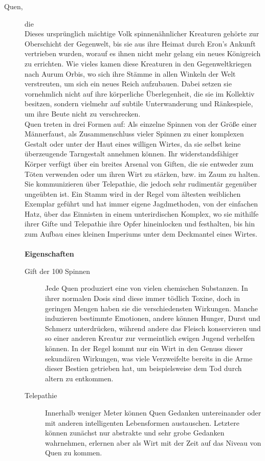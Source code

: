 \documentclass[a4paper,12pt,oneside]{book}
\begin{document}
\begin{description}
\item[Quen,]die
\\Dieses ursprünglich mächtige Volk spinnenähnlicher Kreaturen gehörte zur Oberschicht der Gegenwelt, bis sie aus ihre Heimat durch Eron's Ankunft vertrieben wurden, worauf es ihnen nicht mehr gelang ein neues Königreich zu errichten. Wie vieles kamen diese Kreaturen in den Gegenweltkriegen nach Aurum Orbis, wo sich ihre Stämme in allen Winkeln der Welt verstreuten, um sich ein neues Reich aufzubauen. Dabei setzen sie vornehmlich nicht auf ihre körperliche Überlegenheit, die sie im Kollektiv besitzen, sondern vielmehr auf subtile Unterwanderung und Ränkespiele, um ihre Beute nicht zu verschrecken.
\\Quen treten in drei Formen auf: Als einzelne Spinnen von der Größe einer Männerfaust, als Zusammenschluss vieler Spinnen zu einer komplexen Gestalt oder unter der Haut eines willigen Wirtes, da sie selbst keine überzeugende Tarngestalt annehmen können. Ihr widerstandsfähiger Körper verfügt über ein breites Arsenal von Giften, die sie entweder zum Töten verwenden oder um ihren Wirt zu stärken, bzw. im Zaum zu halten. Sie kommunizieren über Telepathie, die jedoch sehr rudimentär gegenüber ungeübten ist. Ein Stamm wird in der Regel vom ältesten weiblichen Exemplar geführt und hat immer eigene Jagdmethoden, von der einfachen Hatz, über das Einnisten in einem unterirdischen Komplex, wo sie mithilfe ihrer Gifte und Telepathie ihre Opfer hineinlocken und festhalten, bis hin zum Aufbau eines kleinen Imperiums unter dem Deckmantel eines Wirtes.
\\\\\textbf{Eigenschaften}
\begin{description}
\item[Gift der 100 Spinnen]Jede Quen produziert eine von vielen chemischen Substanzen. In ihrer normalen Dosis sind diese immer tödlich Toxine, doch in geringen Mengen haben sie die verschiedensten Wirkungen. Manche induzieren bestimmte Emotionen, andere können Hunger, Durst und Schmerz unterdrücken, während andere das Fleisch konservieren und so einer anderen Kreatur zur vermeintlich ewigen Jugend verhelfen können. In der Regel kommt nur ein Wirt in den Genuss dieser sekundären Wirkungen, was viele Verzweifelte bereits in die Arme dieser Bestien getrieben hat, um beispielsweise dem Tod durch altern zu entkommen.
\item[Telepathie]Innerhalb weniger Meter können Quen Gedanken untereinander oder mit anderen intelligenten Lebensformen austauschen. Letztere können zunächst nur abstrakte und sehr grobe Gedanken wahrnehmen, erlernen aber als Wirt mit der Zeit auf das Niveau von Quen zu kommen. 

\end{description}
\end{description}
\end{document}
